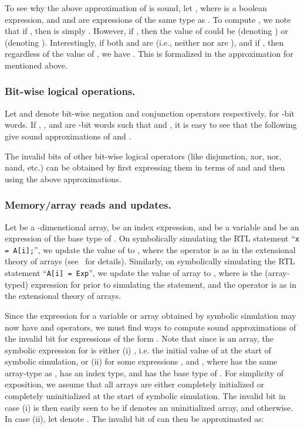 \documentclass{llncs}
\begin{document}
To see why the above approximation of  is sound, let
, where
 is a boolean expression, and  and
 are expressions of the same type as .  To compute
, we note that if , then  is simply
.  However, if
, then the value of 
could be  (denoting ) or  (denoting ).
Interestingly, if both  and
 are  (i.e., neither
 nor  are ), and
if , then
regardless of the value of , we have
.  This is formalized in the approximation
for  mentioned above.


\subsubsection{Bit-wise logical operations.} Let 
and  denote bit-wise negation and conjunction operators
respectively, for -bit words.  If , ,  and  are -bit
words such that  and , it is easy to
see that the following give sound approximations of  and
.

The invalid bits of other bit-wise logical operators (like
disjunction, xor, nor, nand, etc.) can be obtained by first expressing
them in terms of  and  and then using the above
approximations.


\subsubsection{Memory/array reads and updates.} Let
 be a -dimenstional array,  be an index
expression, and  be a variable and  be an
expression of the base type of .  On symbolically simulating the
RTL statement ``{\tt x = A[i];}'', we update the value of 
to , where the  operator
is as in the extensional theory of arrays
(see~\cite{StumpBarrettDill01} for details).  Similarly, on
symbolically simulating the RTL statement ``{\tt A[i] = Exp}'', we
update the value of array  to
,
where  is the (array-typed) expression for
 prior to simulating the statement, and the 
operator is as in the extensional theory of arrays. 

Since the expression for a variable or array obtained by symbolic
simulation may now have  and  operators, we
must find ways to compute sound approximations of the invalid bit for
expressions of the form . Note that since  is an array, the
symbolic expression for  is either (i)
, i.e. the initial value of  at
the start of symbolic simulation, or (ii)  for some expressions ,
 and , where  has the same
array-type as ,  has an index type, and
 has the base type of .  For simplicity of
exposition, we assume that all arrays are either completely
initialized or completely uninitialized at the start of symbolic
simulation.  The invalid bit in case (i) is then easily seen to be
 if  denotes an uninitialized
array, and  otherwise.  In case (ii), let  denote
.  The invalid bit of  can
then be approximated as:
\end{document}
